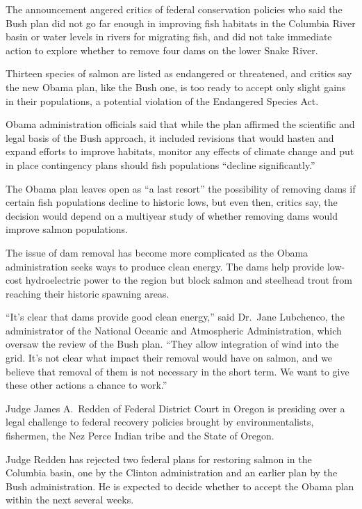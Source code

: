 ﻿\documentclass[12pt]{article}
\begin{document}
The announcement angered critics of federal conservation policies who said the Bush plan did not go
far enough in improving fish habitats in the Columbia River basin or water levels in rivers for
migrating fish, and did not take immediate action to explore whether to remove four dams on the
lower Snake River.

Thirteen species of salmon are listed as endangered or threatened, and critics say the new Obama
plan, like the Bush one, is too ready to accept only slight gains in their populations, a potential
violation of the Endangered Species Act.

Obama administration officials said that while the plan affirmed the scientific and legal basis of
the Bush approach, it included revisions that would hasten and expand efforts to improve habitats,
monitor any effects of climate change and put in place contingency plans should fish populations
``decline significantly.''

The Obama plan leaves open as ``a last resort'' the possibility of removing dams if certain fish
populations decline to historic lows, but even then, critics say, the decision would depend on a
multiyear study of whether removing dams would improve salmon populations.

The issue of dam removal has become more complicated as the Obama administration seeks ways to
produce clean energy. The dams help provide low-cost hydroelectric power to the region but block
salmon and steelhead trout from reaching their historic spawning areas.

``It's clear that dams provide good clean energy,'' said Dr.~Jane Lubchenco, the administrator of
the National Oceanic and Atmospheric Administration, which oversaw the review of the Bush plan.
``They allow integration of wind into the grid. It's not clear what impact their removal would have
on salmon, and we believe that removal of them is not necessary in the short term. We want to give
these other actions a chance to work.''

Judge James A.~Redden of Federal District Court in Oregon is presiding over a legal challenge to
federal recovery policies brought by environmentalists, fishermen, the Nez Perce Indian tribe and
the State of Oregon.

Judge Redden has rejected two federal plans for restoring salmon in the Columbia basin, one by the
Clinton administration and an earlier plan by the Bush administration. He is expected to decide
whether to accept the Obama plan within the next several weeks.
\end{document}
